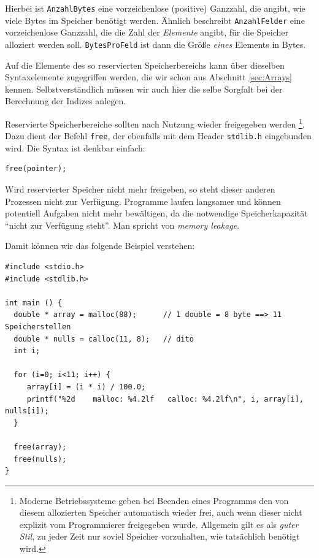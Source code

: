 Hierbei ist \texttt{AnzahlBytes} eine vorzeichenlose (\ie positive) Ganzzahl, die angibt, wie viele Bytes im Speicher benötigt werden. Ähnlich beschreibt \texttt{AnzahlFelder} eine vorzeichenlose Ganzzahl, die die Zahl der \emph{Elemente} angibt, für die Speicher alloziert werden soll. \texttt{BytesProFeld} ist dann die Größe \emph{eines} Elements in Bytes.

Auf die Elemente des so reservierten Speicherbereichs kann über dieselben Syntaxelemente zugegriffen werden, die wir schon aus Abschnitt \ref{sec:Arrays} kennen. Selbstverständlich müssen wir auch hier die selbe Sorgfalt bei der Berechnung der Indizes anlegen.

Reservierte Speicherbereiche sollten nach Nutzung wieder freigegeben werden
\footnote{Moderne Betriebssysteme geben bei Beenden eines Programms den von diesem allozierten Speicher automatisch wieder frei, auch wenn dieser nicht explizit vom Programmierer freigegeben wurde. Allgemein gilt es als \emph{guter Stil}, zu jeder Zeit nur soviel Speicher vorzuhalten, wie tatsächlich benötigt wird.}.
Dazu dient der Befehl \texttt{free}, der ebenfalls mit dem Header \texttt{stdlib.h} eingebunden wird. Die Syntax ist denkbar einfach:

\begin{codebox}
\begin{verbatim}
free(pointer);
\end{verbatim}
\end{codebox}

Wird reservierter Speicher nicht mehr freigeben, so steht dieser anderen Prozessen nicht zur Verfügung. Programme laufen langsamer und können potentiell Aufgaben nicht mehr bewältigen, da die notwendige Speicherkapazität \enquote{nicht zur Verfügung steht}. Man spricht von \emph{memory leakage}.

Damit können wir das folgende Beispiel verstehen:

\begin{codebox}
\begin{verbatim}
#include <stdio.h>
#include <stdlib.h>

int main () {
  double * array = malloc(88);      // 1 double = 8 byte ==> 11 Speicherstellen
  double * nulls = calloc(11, 8);   // dito
  int i;

  for (i=0; i<11; i++) {
     array[i] = (i * i) / 100.0;
     printf("%2d    malloc: %4.2lf   calloc: %4.2lf\n", i, array[i], nulls[i]);
  }

  free(array);
  free(nulls);
}
\end{verbatim}
\end{codebox}


